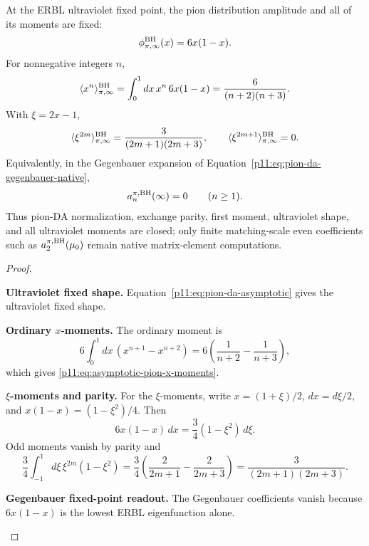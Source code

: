 \documentclass[12pt,a4paper]{article}
\begin{document}
\begin{corollary}
\label{p11:cor:asymptotic-pion-da-moments}
At the ERBL ultraviolet fixed point, the pion distribution amplitude and all of
its moments are fixed:
\begin{equation}
\label{p11:eq:asymptotic-pion-da-fixed-shape}
\phi_{\pi,\infty}^{\rm BH}(x)=6x(1-x).
\end{equation}
For nonnegative integers \(n\),
\begin{equation}
\label{p11:eq:asymptotic-pion-x-moments}
\langle x^n\rangle_{\pi,\infty}^{\rm BH}
=
\int_0^1dx\,x^n\,6x(1-x)
=
\frac{6}{(n+2)(n+3)}.
\end{equation}
With \(\xi=2x-1\),
\begin{equation}
\label{p11:eq:asymptotic-pion-xi-moments}
\langle \xi^{2m}\rangle_{\pi,\infty}^{\rm BH}
=
\frac{3}{(2m+1)(2m+3)},
\qquad
\langle \xi^{2m+1}\rangle_{\pi,\infty}^{\rm BH}=0 .
\end{equation}
Equivalently, in the Gegenbauer expansion of
Equation~\eqref{p11:eq:pion-da-gegenbauer-native},
\begin{equation}
\label{p11:eq:asymptotic-pion-gegenbauer-vanishing}
a_n^{\pi,\rm BH}(\infty)=0\qquad(n\ge1).
\end{equation}
Thus pion-DA normalization, exchange parity, first moment, ultraviolet shape, and
all ultraviolet moments are closed; only finite matching-scale even coefficients
such as \(a_2^{\pi,\rm BH}(\mu_0)\) remain native matrix-element computations.
\end{corollary}
\begin{proof}
\begin{proofsteps}
\item \textbf{Ultraviolet fixed shape.}
Equation~\eqref{p11:eq:pion-da-asymptotic} gives the ultraviolet fixed shape.

\item \textbf{Ordinary \(x\)-moments.}
The
ordinary moment is
\[
6\int_0^1dx\,(x^{n+1}-x^{n+2})
=6\left(\frac1{n+2}-\frac1{n+3}\right),
\]
which gives \eqref{p11:eq:asymptotic-pion-x-moments}.

\item \textbf{\(\xi\)-moments and parity.}
For the \(\xi\)-moments,
write \(x=(1+\xi)/2\), \(dx=d\xi/2\), and
\(x(1-x)=(1-\xi^2)/4\).  Then
\[
6x(1-x)\,dx=\frac34(1-\xi^2)\,d\xi .
\]
Odd moments vanish by parity and
\[
\frac34\int_{-1}^{1}d\xi\,\xi^{2m}(1-\xi^2)
=
\frac34\left(\frac{2}{2m+1}-\frac{2}{2m+3}\right)
=
\frac{3}{(2m+1)(2m+3)}.
\]

\item \textbf{Gegenbauer fixed-point readout.}
The Gegenbauer coefficients vanish because \(6x(1-x)\) is the lowest ERBL
eigenfunction alone.
\end{proofsteps}
\end{proof}
\end{document}
